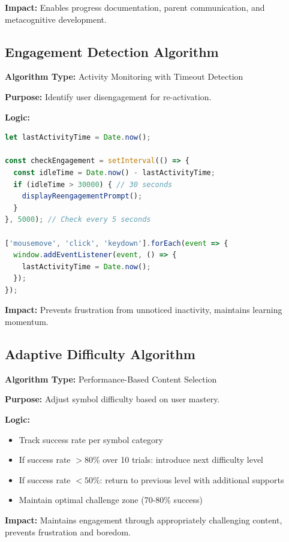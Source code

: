 \documentclass[11pt, a4paper]{article}
\begin{document}
\textbf{Impact:} Enables progress documentation, parent communication, and metacognitive development.

\subsection{Engagement Detection Algorithm}

\textbf{Algorithm Type:} Activity Monitoring with Timeout Detection

\textbf{Purpose:} Identify user disengagement for re-activation.

\textbf{Logic:}
\begin{lstlisting}[language=JavaScript]
let lastActivityTime = Date.now();

const checkEngagement = setInterval(() => {
  const idleTime = Date.now() - lastActivityTime;
  if (idleTime > 30000) { // 30 seconds
    displayReengagementPrompt();
  }
}, 5000); // Check every 5 seconds

['mousemove', 'click', 'keydown'].forEach(event => {
  window.addEventListener(event, () => {
    lastActivityTime = Date.now();
  });
});
\end{lstlisting}

\textbf{Impact:} Prevents frustration from unnoticed inactivity, maintains learning momentum.

\subsection{Adaptive Difficulty Algorithm}

\textbf{Algorithm Type:} Performance-Based Content Selection

\textbf{Purpose:} Adjust symbol difficulty based on user mastery.

\textbf{Logic:}
\begin{itemize}[leftmargin=*, noitemsep]
    \item Track success rate per symbol category
    \item If success rate $> 80\%$ over 10 trials: introduce next difficulty level
    \item If success rate $< 50\%$: return to previous level with additional supports
    \item Maintain optimal challenge zone (70-80\% success)
\end{itemize}

\textbf{Impact:} Maintains engagement through appropriately challenging content, prevents frustration and boredom.
\end{document}
